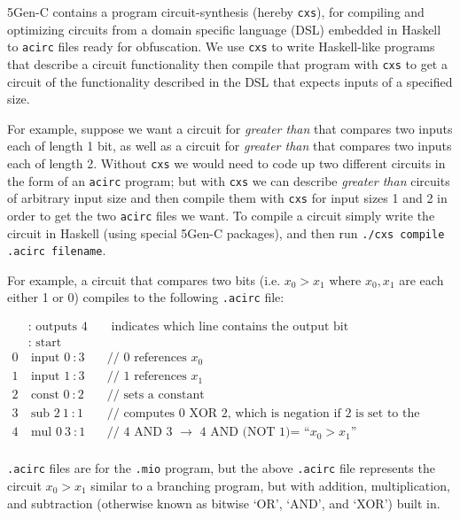 \documentclass[12pt,twoside]{reedthesis}
\begin{document}
   5Gen-C contains a program circuit-synthesis (hereby \texttt{cxs}), for compiling and optimizing circuits from a domain specific language (DSL) embedded in Haskell to \texttt{acirc} files ready for obfuscation. We use \texttt{cxs} to write Haskell-like programs that describe a circuit functionality then compile that program with \texttt{cxs} to get a circuit of the functionality described in the DSL that expects inputs of a specified size.
   \par For example, suppose we want a circuit for \textit{greater than} that compares two inputs each of length 1 bit, as well as a circuit for \textit{greater than} that compares two inputs each of length 2. Without \texttt{cxs} we would need to code up two different circuits in the form of an \texttt{acirc} program; but with \texttt{cxs} we can describe \textit{greater than} circuits of arbitrary input size and then compile them with \texttt{cxs} for input sizes 1 and 2 in order to get the two \texttt{acirc} files we want. To compile a circuit simply write the circuit in Haskell (using special 5Gen-C packages), and then run \texttt{./cxs compile .acirc filename}.
   \par For example, a circuit that compares two bits (i.e. $x_0 > x_1$ where $x_0,x_1$ are each either 1 or 0) compiles to the following \texttt{.acirc} file:
   
   \newcommand{\sub}[0]{\text{ sub }}
   \newcommand{\mul}[0]{\text{ mul }}
   
   \begin{align*}
  &\text{: outputs } 4 &&\text{ indicates which line contains the output bit} \\
  &\text{: start }  & \\
0&\ \text{input } 0\ : 3  &&\text{// 0 references $x_0$} \\
1&\ \text{input } 1\ : 3  &&\text{// 1 references $x_1$} \\
2&\ \text{const } 0\ : 2 &&\text{// sets a constant} \\
3&\ \text{sub } 2\ 1\ : 1 &&\text{// computes 0 XOR 2, which is negation if 2 is set to the value ``1''} \\
4&\ \text{mul } 0\ 3\ : 1 &&\text{// 4 AND 3 $\to$ 4 AND (NOT 1)= ``$x_0 >x_1$''} \\
   \end{align*} 
  
   \texttt{.acirc} files are for the \texttt{.mio} program, but the above \texttt{.acirc} file represents the circuit $x_0 > x_1$ similar to a branching program, but with addition, multiplication, and subtraction (otherwise known as bitwise `OR', `AND', and `XOR') built in.          
         
\end{document}
